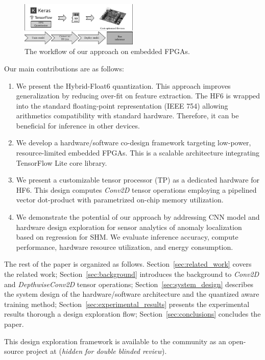 \begin{figure}[t!]
	\centering
	\includegraphics[width=0.5\textwidth]{../figures/workflow.pdf}
	\caption{The workflow of our approach on embedded FPGAs.}
	\label{fig:workflow}
\end{figure}

Our main contributions are as follows:
\begin{enumerate}
	\item We present the Hybrid-Float6 quantization. This approach improves generalization by reducing over-fit on feature extraction. The HF6 is wrapped into the standard floating-point representation (IEEE 754) allowing arithmetics compatibility with standard hardware. Therefore, it can be beneficial for inference in other devices.
	\item We develop a hardware/software co-design framework targeting low-power, resource-limited embedded FPGAs. This is a scalable architecture integrating TensorFlow Lite core library.
	\item We present a customizable tensor processor (TP) as a dedicated hardware for HF6. This design computes \emph{Conv2D} tensor operations employing a pipelined vector dot-product with parametrized on-chip memory utilization.
	\item We demonstrate the potential of our approach by addressing CNN model and hardware design exploration for sensor analytics of anomaly localization based on regression for SHM. We evaluate inference accuracy, compute performance, hardware resource utilization, and energy consumption.
\end{enumerate}

The rest of the paper is organized as follows. Section~\ref{sec:related_work} covers the related work; Section~\ref{sec:background} introduces the background to \emph{Conv2D} and \emph{DepthwiseConv2D} tensor operations; Section~\ref{sec:system_design} describes the system design of the hardware/software architecture and the quantized aware training method; Section~\ref{sec:experimental_results} presents the experimental results thorough a design exploration flow; Section~\ref{sec:conclusions} concludes the paper.

This design exploration framework is available to the community as an open-source project at (\emph{hidden for double blinded review}).